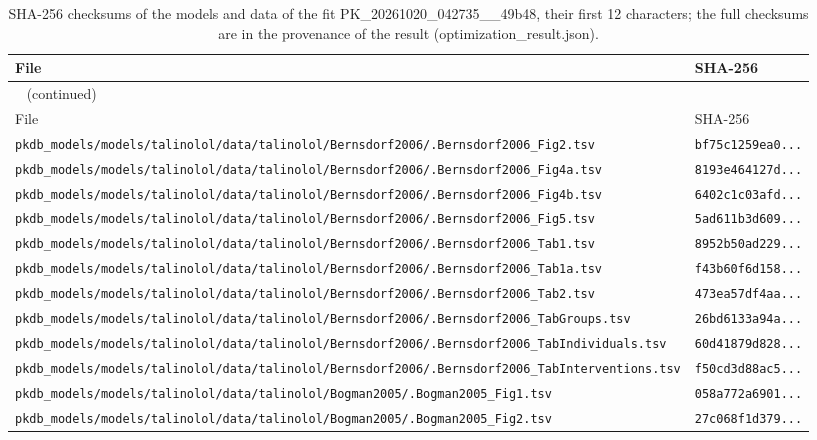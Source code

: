 \begin{longtable}{ll}
\caption{SHA-256 checksums of the models and data of the fit PK\_20261020\_042735\_\_49b48, their first 12 characters; the full checksums are in the provenance of the result (optimization\_result.json).}\label{tab:checksums:PK_20261020_042735__49b48} \\
\toprule
File & SHA-256 \\
\midrule
\endfirsthead
\multicolumn{2}{l}{\small\tablename~\thetable{} (continued)} \\
\toprule
File & SHA-256 \\
\midrule
\endhead
\bottomrule
\endlastfoot
\texttt{pkdb\_models/models/talinolol/data/talinolol/Bernsdorf2006/.Bernsdorf2006\_Fig2.tsv} & \texttt{bf75c1259ea0...} \\
\texttt{pkdb\_models/models/talinolol/data/talinolol/Bernsdorf2006/.Bernsdorf2006\_Fig4a.tsv} & \texttt{8193e464127d...} \\
\texttt{pkdb\_models/models/talinolol/data/talinolol/Bernsdorf2006/.Bernsdorf2006\_Fig4b.tsv} & \texttt{6402c1c03afd...} \\
\texttt{pkdb\_models/models/talinolol/data/talinolol/Bernsdorf2006/.Bernsdorf2006\_Fig5.tsv} & \texttt{5ad611b3d609...} \\
\texttt{pkdb\_models/models/talinolol/data/talinolol/Bernsdorf2006/.Bernsdorf2006\_Tab1.tsv} & \texttt{8952b50ad229...} \\
\texttt{pkdb\_models/models/talinolol/data/talinolol/Bernsdorf2006/.Bernsdorf2006\_Tab1a.tsv} & \texttt{f43b60f6d158...} \\
\texttt{pkdb\_models/models/talinolol/data/talinolol/Bernsdorf2006/.Bernsdorf2006\_Tab2.tsv} & \texttt{473ea57df4aa...} \\
\texttt{pkdb\_models/models/talinolol/data/talinolol/Bernsdorf2006/.Bernsdorf2006\_TabGroups.tsv} & \texttt{26bd6133a94a...} \\
\texttt{pkdb\_models/models/talinolol/data/talinolol/Bernsdorf2006/.Bernsdorf2006\_TabIndividuals.tsv} & \texttt{60d41879d828...} \\
\texttt{pkdb\_models/models/talinolol/data/talinolol/Bernsdorf2006/.Bernsdorf2006\_TabInterventions.tsv} & \texttt{f50cd3d88ac5...} \\
\texttt{pkdb\_models/models/talinolol/data/talinolol/Bogman2005/.Bogman2005\_Fig1.tsv} & \texttt{058a772a6901...} \\
\texttt{pkdb\_models/models/talinolol/data/talinolol/Bogman2005/.Bogman2005\_Fig2.tsv} & \texttt{27c068f1d379...} \\

\end{longtable}
